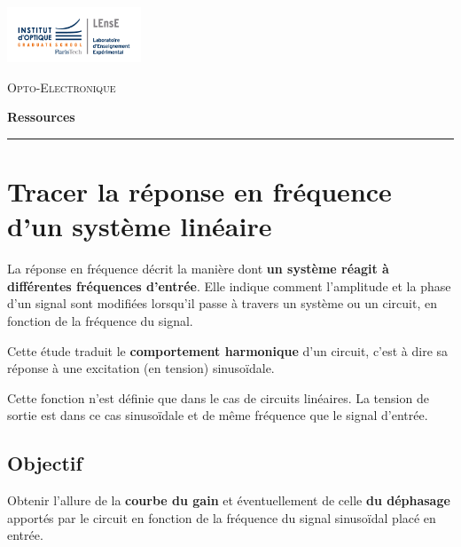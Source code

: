\newpage
\pagestyle{empty}

\begin{minipage}[c]{.25\linewidth}
	\includegraphics[width=4cm]{images/Logo-LEnsE.png}
\end{minipage} \hfill
\begin{minipage}[c]{.4\linewidth}

\begin{center}
\vspace{0.3cm}
{\Large \textsc{Opto-Electronique}}

\medskip

\textbf{\Large Ressources}

\end{center}
\end{minipage}\hfill

\vspace{0.5cm}

\noindent \rule{\linewidth}{1pt}
\section{Tracer la réponse en fréquence d'un système linéaire}
\label{ressource:RepFreq}



La réponse en fréquence décrit la manière dont \textbf{un système réagit à différentes fréquences d'entrée}. Elle indique comment l'amplitude et la phase d'un signal sont modifiées lorsqu'il passe à travers un système ou un circuit, en fonction de la fréquence du signal.

Cette étude traduit le \textbf{comportement harmonique} d'un circuit, c'est à dire sa réponse à une excitation (en tension) sinusoïdale.

Cette fonction n'est définie que dans le cas de circuits linéaires. La tension de sortie est dans ce cas sinusoïdale et de même fréquence que le signal d'entrée.

\subsection*{Objectif}

Obtenir l'allure de la \textbf{courbe du gain} et éventuellement de celle \textbf{du déphasage} apportés par le circuit en fonction de la fréquence du signal sinusoïdal placé en entrée.

